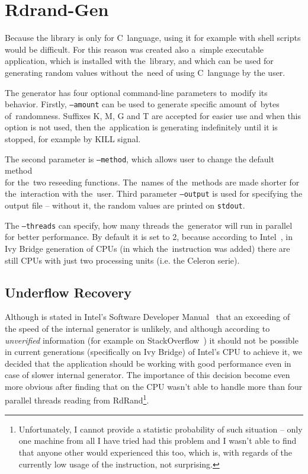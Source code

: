 
\chapter{Rdrand-Gen} \label{chap:generator}
\par{
Because the library is only for C~language, using it for example with shell scripts would be difficult. For this reason was created also a~simple executable application, which is installed with the~library, and which can be used for generating random values without the~need of using C~language by the user.
}

\par{
The generator has four optional command-line parameters to~modify its behavior. Firstly, {\tt --amount} can be used to generate specific amount of~bytes of~randomness. Suffixes K, M, G and T are accepted for easier use and when this option is not used, then the~application is generating indefinitely until it is stopped, for example by KILL signal.
}

\par{
The second parameter is {\tt --method}, which allows user to change the default method \\ for the~two reseeding functions. The~names of the~methods are made shorter for the~interaction with the~user. Third parameter {\tt --output} is used for specifying the output file -- without it, the random values are printed on {\tt stdout}. 
}

\par{
The {\tt --threads} can specify, how many threads the~generator will run in parallel for better performance. By default it is set to 2, because according to Intel~\cite{IntelArk}, in Ivy Bridge generation of CPUs (in which the~instruction was added) there are still CPUs with just two processing units (i.e. the Celeron serie).
}

\section{Underflow Recovery}
\par{
Although is stated in Intel's Software Developer Manual~\cite[chapter~7.3.17]{IntelSWManualVol1} that an exceeding of the speed of the internal generator is unlikely, and although according to {\em unverified} information (for example on StackOverflow~\cite{StackoverflowRDRANDCharacteristics}) it should not be possible in current generations (specifically on Ivy Bridge) of Intel's CPU to achieve it, we decided that the application should be working with good performance even in case of slower internal generator. The importance of this decision become even more obvious after finding that on  the CPU wasn't able to handle more than four parallel threads reading from RdRand\footnote{Unfortunately, I cannot provide a statistic probability of such situation -- only one machine from all I have tried had this problem and I wasn't able to find that anyone other would experienced this too, which is, with regards of the currently low usage of the instruction, not surprising.}.
}

